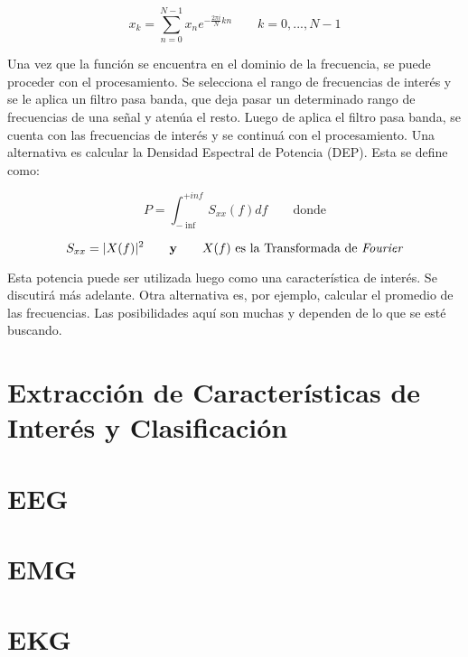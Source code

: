$$ x_{k} = \sum_{n=0}^{N-1} x_{n}e^{-\frac{2 \pi i}{N}kn} \qquad k = 0,..., N - 1 $$

Una vez que la función se encuentra en el dominio de la frecuencia, se puede proceder con el procesamiento. Se selecciona el rango de frecuencias de interés y se le aplica un filtro pasa banda, que deja pasar un determinado rango de frecuencias de una señal y atenúa el resto. Luego de aplica el filtro pasa banda,  se cuenta con las frecuencias de interés y se continuá con el procesamiento. Una alternativa es calcular la Densidad Espectral de Potencia (DEP). Esta se define como:

$$ P = \int_{-\inf}^{+inf} S_{xx} (f) df \qquad  \textrm{donde}$$

$$ S_{xx} = |X(f)|^{2} \qquad \textbf{y} \qquad X(f) \textrm{ es la Transformada de \emph{Fourier}} $$

Esta potencia puede ser utilizada luego como una característica de interés. Se discutirá más adelante. Otra alternativa  es, por ejemplo, calcular el promedio de las frecuencias. Las posibilidades aquí son muchas y dependen de lo que se esté buscando.

\section{Extracción de Características de Interés y Clasificación}

\section{EEG}

\section{EMG}

\section{EKG}